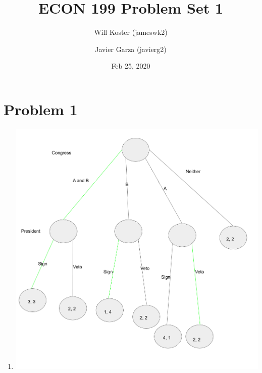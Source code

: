 \documentclass[letterpaper]{article}
\begin{document}
\title{ECON 199 Problem Set 1}
\author{Will Koster (jameswk2)}
\author{Javier Garza (javierg2)}
\date{Feb 25, 2020}
\maketitle

\clearpage

\section{Problem 1}
\begin{enumerate}
    \item \includegraphics[scale=0.4]{fig1}

\end{enumerate}
\end{document}
